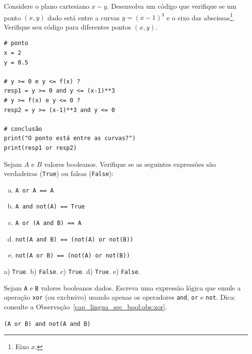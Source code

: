 \begin{exer}
  Considere o plano cartesiano $x-y$. Desenvolva um código que verifique se um ponto $(x, y)$ dado está entre a curvas $y = (x-1)^3$ e o eixo das abscissas\footnote{Eixo $x$.}. Verifique seu código para diferentes pontos $(x, y)$.
\end{exer}
\begin{resp}

\begin{lstlisting}
# ponto
x = 2
y = 0.5

# y >= 0 e y <= f(x) ?
resp1 = y >= 0 and y <= (x-1)**3
# y >= f(x) e y <= 0 ?
resp2 = y >= (x-1)**3 and y <= 0

# conclusão
print("O ponto está entre as curvas?")
print(resp1 or resp2)
\end{lstlisting}

\end{resp}

\begin{exer}
  Sejam $A$ e $B$ valores booleanos. Verifique se as seguintes expressões são verdadeiras (\texttt{True}) ou falsas (\texttt{False}):
  \begin{enumerate}[a)]
  \item \lstinline+A or A == A+
  \item \lstinline+A and not(A) == True+
  \item \lstinline+A or (A and B) == A+
  \item \lstinline+not(A and B) == (not(A) or not(B))+
  \item \lstinline+not(A or B) == (not(A) or not(B))+
  \end{enumerate}
\end{exer}
\begin{resp}
  a) \texttt{True}. b) \texttt{False}. c) \texttt{True}. d) \texttt{True}. e) \texttt{False}.
\end{resp}

\begin{exer}\label{cap_lingua_sec_bool:exer:xor}
  Sejam \texttt{A} e \texttt{B} valores booleanos dados. Escreva uma expressão lógica que emule a operação \lstinline+xor+ (ou exclusivo) usando apenas os operadores \lstinline+and+, \lstinline+or+ e \lstinline+not+. Dica: consulte a Observação~\ref{cap_lingua_sec_bool:obs:xor}.
\end{exer}
\begin{resp}
  \lstinline+(A or B) and not(A and B)+
\end{resp}

\ifisbook
